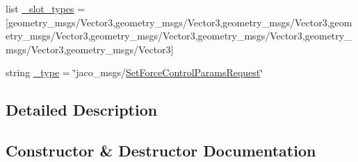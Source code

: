 \begin{DoxyCompactItemize}
\item 
list \hyperlink{classjaco__msgs_1_1srv_1_1__SetForceControlParams_1_1SetForceControlParamsRequest_a63633167cd908fb0ef6d893211cef0d4}{\+\_\+slot\+\_\+types} = \mbox{[}\textquotesingle{}geometry\+\_\+msgs/Vector3\textquotesingle{},\textquotesingle{}geometry\+\_\+msgs/Vector3\textquotesingle{},\textquotesingle{}geometry\+\_\+msgs/Vector3\textquotesingle{},\textquotesingle{}geometry\+\_\+msgs/Vector3\textquotesingle{},\textquotesingle{}geometry\+\_\+msgs/Vector3\textquotesingle{},\textquotesingle{}geometry\+\_\+msgs/Vector3\textquotesingle{},\textquotesingle{}geometry\+\_\+msgs/Vector3\textquotesingle{},\textquotesingle{}geometry\+\_\+msgs/Vector3\textquotesingle{}\mbox{]}
\item 
string \hyperlink{classjaco__msgs_1_1srv_1_1__SetForceControlParams_1_1SetForceControlParamsRequest_a21a4bdfc6b7757d0e04bf1b69880aa08}{\+\_\+type} = \char`\"{}jaco\+\_\+msgs/\hyperlink{classjaco__msgs_1_1srv_1_1__SetForceControlParams_1_1SetForceControlParamsRequest}{Set\+Force\+Control\+Params\+Request}\char`\"{}
\end{DoxyCompactItemize}


\subsection{Detailed Description}


\subsection{Constructor \& Destructor Documentation}

